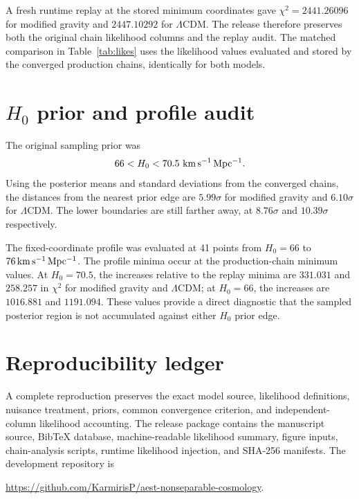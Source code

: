 \documentclass[aps,prd,twocolumn,superscriptaddress,nofootinbib,longbibliography,floatfix]{revtex4-2}
\newcommand{\LCDM}{\Lambda\mathrm{CDM}}
\begin{document}
A fresh runtime replay at the stored minimum coordinates gave $\chi^2=2441.26096$ for modified gravity and $2447.10292$ for $\LCDM$. The release therefore preserves both the original chain likelihood columns and the replay audit. The matched comparison in Table~\ref{tab:likes} uses the likelihood values evaluated and stored by the converged production chains, identically for both models.

\section{$H_0$ prior and profile audit}\label{app:h0audit}
The original sampling prior was
\begin{equation}
66<H_0<70.5\ {\rm km\,s^{-1}\,Mpc^{-1}}.
\end{equation}
Using the posterior means and standard deviations from the converged chains, the distances from the nearest prior edge are $5.99\sigma$ for modified gravity and $6.10\sigma$ for $\LCDM$. The lower boundaries are still farther away, at $8.76\sigma$ and $10.39\sigma$ respectively.

The fixed-coordinate profile was evaluated at 41 points from $H_0=66$ to $76\,{\rm km\,s^{-1}\,Mpc^{-1}}$. The profile minima occur at the production-chain minimum values. At $H_0=70.5$, the increases relative to the replay minima are $331.031$ and $258.257$ in $\chi^2$ for modified gravity and $\LCDM$; at $H_0=66$, the increases are $1016.881$ and $1191.094$. These values provide a direct diagnostic that the sampled posterior region is not accumulated against either $H_0$ prior edge.

\section{Reproducibility ledger}\label{app:repro}
A complete reproduction preserves the exact model source, likelihood definitions, nuisance treatment, priors, common convergence criterion, and independent-column likelihood accounting. The release package contains the manuscript source, BibTeX database, machine-readable likelihood summary, figure inputs, chain-analysis scripts, runtime likelihood injection, and SHA-256 manifests. The development repository is
\begin{center}
\url{https://github.com/KarmirisP/aest-nonseparable-cosmology}.
\end{center}


\end{document}

